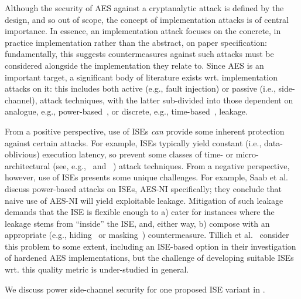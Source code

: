 
Although the security of AES against a cryptanalytic attack is defined by
the design, and so out of scope, the concept of implementation attacks is
of central importance.
In essence, an implementation attack focuses on
the concrete, in practice implementation
rather than
the abstract, on paper     specification:
fundamentally, this suggests countermeasures against such attacks must be
considered alongside the implementation they relate to.
Since AES is an important target, a significant body of literature exists
wrt. implementation attacks on it: this includes both
 active (e.g., fault injection)
or
passive (i.e., side-channel),
attack techniques,
with the latter sub-divided into those dependent on
analogue,
e.g., power-based~\cite{ManOswPop:07},
or
discrete, 
e.g.,  time-based~\cite{KoeQui:99},
leakage.

From a positive perspective, use of ISEs
{\em can} provide some inherent protection against certain attacks.
For example,
ISEs typically yield constant (i.e., data-oblivious) execution latency,
so prevent some classes of time- or micro-architectural
(see, e.g.,~\cite[Section 4]{Szefer:19} and ~\cite[Section 4]{GYCH:18})
attack techniques.
From a negative perspective, however,
use of ISEs presents some unique challenges.
For example, 
Saab et al.\cite{SaaRohHam:16}
discuss power-based attacks on ISEs, AES-NI specifically; they conclude
that naive use of AES-NI will yield exploitable leakage.  Mitigation of
such leakage demands that the ISE is flexible enough to 
a) cater for instances where the leakage stems from ``inside'' the ISE,
   and, either way,
b) compose with an appropriate
   (e.g., hiding~\cite[Chapter 7]{ManOswPop:07} or masking~\cite[Chapter 10]{ManOswPop:07})
   countermeasure.
Tillich et al.~\cite{TilHerMan:07}
consider this problem to some extent, including an ISE-based option in
their investigation of hardened AES implementations, but the challenge
of developing suitable ISEs wrt. this quality metric is under-studied
in general.

We discuss power side-channel security for one proposed ISE variant
in .

